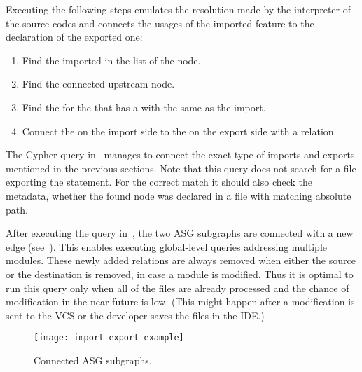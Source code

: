 Executing the following steps emulates the resolution made by the interpreter of the source codes and connects the usages of the imported feature to the declaration of the exported one:

\begin{enumerate}[topsep=0pt]
	\item Find the imported  in the  list of the  node.
	\item Find the connected upstream  node.
	\item Find the  for the  that has a  with the same  as the import.
	\item Connect the  on the import side to the  on the export side with a  relation.
\end{enumerate}

The Cypher query in~ manages to connect the exact type of imports and exports mentioned in the previous sections. Note that this query does not search for a file exporting the statement. For the correct match it should also check the metadata, whether the found node was declared in a file with matching absolute path.

\begin{figure}[!htb]
	\begin{minipage}{\textwidth}
		
	\end{minipage}
\end{figure}

After executing the query in~, the two ASG subgraphs are connected with a new edge (see~). This enables executing global-level queries addressing multiple modules. These newly added relations are always removed when either the source or the destination is removed, in case a module is modified. Thus it is optimal to run this query only when all of the files are already processed and the chance of modification in the near future is low. (This might happen after a modification is sent to the VCS or the developer saves the files in the IDE.)

\begin{sidewaysfigure}[htbp]
  \centering
  \texttt{[image: import-export-example]}
  \caption{Connected ASG subgraphs.}
  \label{fig:import-export-example}
\end{sidewaysfigure}


